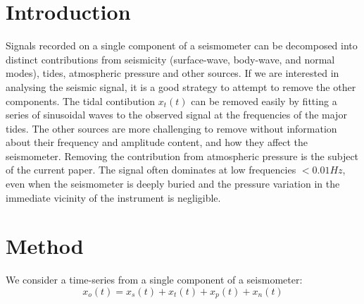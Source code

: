   
  

\date{Received: date / Accepted: date}


\maketitle

\begin{abstract}
  

\end{abstract}



\section{Introduction}
\label{sec:intro}

Signals recorded on a single component of a seismometer can be decomposed into distinct contributions from seismicity (surface-wave, body-wave, and normal modes), tides, atmospheric pressure and other sources. If we are interested in analysing the seismic signal, it is a good strategy to attempt to remove the other components. The tidal contibution $x_{t} (t)$ can be removed easily by fitting a series of sinusoidal waves to the observed signal at the frequencies of the major tides. The other sources are more challenging to remove without information about their frequency and amplitude content, and how they affect the seismometer. Removing the contribution from atmospheric pressure is the subject of the current paper. The signal often dominates at low frequencies $<0.01 Hz$, even when the seismometer is deeply buried and the pressure variation in the immediate vicinity of the instrument is negligible.  

\section{Method}
We consider a time-series from a single component of a seismometer:
\begin{equation}
  x_{o}(t) = x_{s} (t) + x_{t} (t) + x_{p} (t) + x_{n} (t) 
\end{equation}

